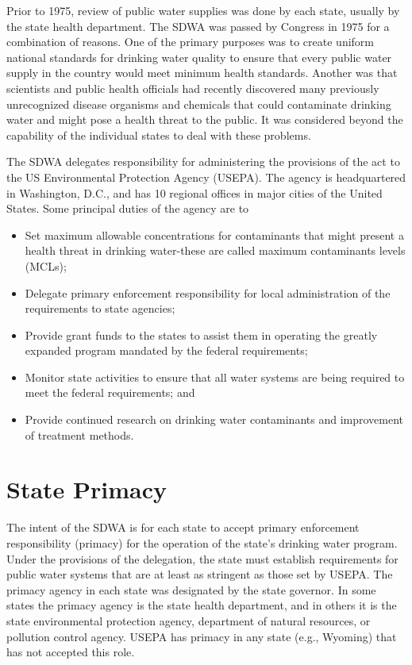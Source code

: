 \documentclass[10pt]{article}
\begin{document}
Prior to 1975, review of public water supplies was done by each state, usually by the state health department. The SDWA was passed by Congress in 1975 for a combination of reasons. One of the primary purposes was to create uniform national standards for drinking water quality to ensure that every public water supply in the country would meet minimum health standards. Another was that scientists and public health officials had recently discovered many previously unrecognized disease organisms and chemicals that could contaminate drinking water and might pose a health threat to the public. It was considered beyond the capability of the individual states to deal with these problems.

The SDWA delegates responsibility for administering the provisions of the act to the US Environmental Protection Agency (USEPA). The agency is headquartered in Washington, D.C., and has 10 regional offices in major cities of the United States. Some principal duties of the agency are to

\begin{itemize}
  \item Set maximum allowable concentrations for contaminants that might present a health threat in drinking water-these are called maximum contaminants levels (MCLs);

  \item Delegate primary enforcement responsibility for local administration of the requirements to state agencies;

  \item Provide grant funds to the states to assist them in operating the greatly expanded program mandated by the federal requirements;

  \item Monitor state activities to ensure that all water systems are being required to meet the federal requirements; and

  \item Provide continued research on drinking water contaminants and improvement of treatment methods.

\end{itemize}
\section{State Primacy}
The intent of the SDWA is for each state to accept primary enforcement responsibility (primacy) for the operation of the state's drinking water program. Under the provisions of the delegation, the state must establish requirements for public water systems that are at least as stringent as those set by USEPA. The primacy agency in each state was designated by the state governor. In some states the primacy agency is the state health department, and in others it is the state environmental protection agency, department of natural resources, or pollution control agency. USEPA has primacy in any state (e.g., Wyoming) that has not accepted this role.
\end{document}
